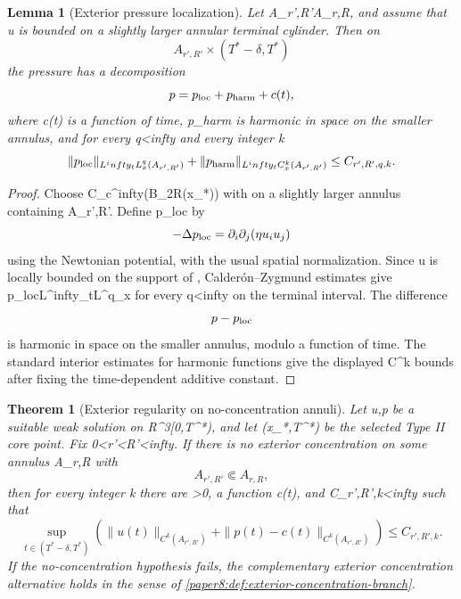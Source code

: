 \documentclass[11pt]{amsart}
\def\({}%
\def\){}%
\def\mathbb#1{#1}%
\def\infty{infty}%
\theoremstyle{plain}
\newtheorem{theorem}{Theorem}[section]
\newtheorem{lemma}[lemma]{Lemma}
\theoremstyle{definition}
\theoremstyle{remark}
\begin{document}
\begin{lemma}[Exterior pressure localization]
\label{paper8:lem:exterior-pressure-localization}
Let \(A_{r',R'}\Subset A_{r,R}\), and assume that \(u\) is bounded on a
slightly larger annular terminal cylinder.  Then on
\[
  A_{r',R'}\times(T^*-\delta,T^*)
\]
the pressure has a decomposition
\[
  p=p_{\rm loc}+p_{\rm harm}+c(t),
\]
where \(c(t)\) is a function of time, \(p_{\rm harm}\) is harmonic in space on
the smaller annulus, and for every \(q<\infty\) and every integer \(k\)
\[
  \|p_{\rm loc}\|_{L^\infty_tL^q_x(A_{r',R'})}
  +
  \|p_{\rm harm}\|_{L^\infty_tC^k_x(A_{r',R'})}
  \le C_{r',R',q,k}.
\]
\end{lemma}

\begin{proof}
Choose \(\eta\in C_c^\infty(B_{2R}(x_*)\setminus {})\)
with \(\eta{}\) on a slightly larger annulus containing \(A_{r',R'}\).
Define \(p_{\rm loc}\) by
\[
  -\Delta p_{\rm loc}
  =
  \partial_i\partial_j(\eta u_i u_j)
\]
using the Newtonian potential, with the usual spatial normalization.  Since
\(u\) is locally bounded on the support of \(\eta\), Calder\'on--Zygmund
estimates give \(p_{\rm loc}\in L^\infty_tL^q_x\) for every \(q<\infty\) on
the terminal interval.  The difference
\[
  p-p_{\rm loc}
\]
is harmonic in space on the smaller annulus, modulo a function of time.  The
standard interior estimates for harmonic functions give the displayed
\(C^k\) bounds after fixing the time-dependent additive constant.
\end{proof}

\begin{theorem}[Exterior regularity on no-concentration annuli]
\label{paper8:thm:exterior-regularity-no-concentration}
Let \(u,p\) be a suitable weak solution on
\(\mathbb R^3\times[0,T^*)\), and let \((x_*,T^*)\) be the selected Type II
core point.  Fix \(0<r'<R'<\infty\).  If there is no exterior concentration on
some annulus \(A_{r,R}\) with
\[
  A_{r',R'}\Subset A_{r,R},
\]
then for every integer \(k\) there are \(\delta>0\), a function
\(c(t)\), and \(C_{r',R',k}<\infty\) such that
\[
  \sup_{t\in(T^*-\delta,T^*)}
  \left(
  \|u(t)\|_{C^k(A_{r',R'})}
  +
  \|p(t)-c(t)\|_{C^k(A_{r',R'})}
  \right)
  \le C_{r',R',k}.
\]
If the no-concentration hypothesis fails, the complementary exterior
concentration alternative holds in the sense of
\cref{paper8:def:exterior-concentration-branch}.
\end{theorem}
\end{document}
